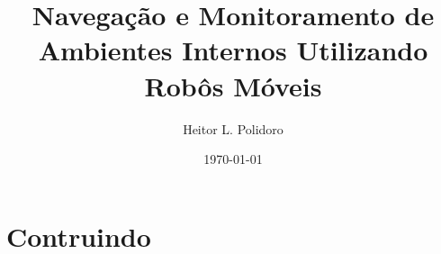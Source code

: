 \documentclass{beamer}
\title{Navegação e Monitoramento de Ambientes Internos Utilizando Robôs Móveis}
\author{Heitor L. Polidoro}
\date{\today}
\begin{document}
\section{Contruindo}
%
%
%
\end{document}
